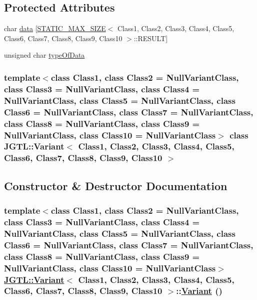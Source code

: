 \subsection*{Protected Attributes}
\begin{CompactItemize}
\item 
char \hyperlink{class_j_g_t_l_1_1_variant_1cc3c7fe89182f0ba7915d5d2de199db}{data} \mbox{[}\hyperlink{struct_j_g_t_l_1_1_s_t_a_t_i_c___m_a_x___s_i_z_e}{STATIC\_\-MAX\_\-SIZE}$<$ Class1, Class2, Class3, Class4, Class5, Class6, Class7, Class8, Class9, Class10 $>$::RESULT\mbox{]}
\item 
unsigned char \hyperlink{class_j_g_t_l_1_1_variant_c9ace9530818f4e6ee22ac3cb539a5f2}{type\-Of\-Data}
\end{CompactItemize}
\subsubsection*{template$<$class Class1, class Class2 = Null\-Variant\-Class, class Class3 = Null\-Variant\-Class, class Class4 = Null\-Variant\-Class, class Class5 = Null\-Variant\-Class, class Class6 = Null\-Variant\-Class, class Class7 = Null\-Variant\-Class, class Class8 = Null\-Variant\-Class, class Class9 = Null\-Variant\-Class, class Class10 = Null\-Variant\-Class$>$ class JGTL::Variant$<$ Class1, Class2, Class3, Class4, Class5, Class6, Class7, Class8, Class9, Class10 $>$}



\subsection{Constructor \& Destructor Documentation}
\hypertarget{class_j_g_t_l_1_1_variant_c3e3ced5f3f7ad56b04f44a2c8661aa7}{
\subsubsection[Variant]{\setlength{\rightskip}{0pt plus 5cm}template$<$class Class1, class Class2 = Null\-Variant\-Class, class Class3 = Null\-Variant\-Class, class Class4 = Null\-Variant\-Class, class Class5 = Null\-Variant\-Class, class Class6 = Null\-Variant\-Class, class Class7 = Null\-Variant\-Class, class Class8 = Null\-Variant\-Class, class Class9 = Null\-Variant\-Class, class Class10 = Null\-Variant\-Class$>$ \hyperlink{class_j_g_t_l_1_1_variant}{JGTL::Variant}$<$ Class1, Class2, Class3, Class4, Class5, Class6, Class7, Class8, Class9, Class10 $>$::\hyperlink{class_j_g_t_l_1_1_variant}{Variant} ()}}
\label{class_j_g_t_l_1_1_variant_c3e3ced5f3f7ad56b04f44a2c8661aa7}




